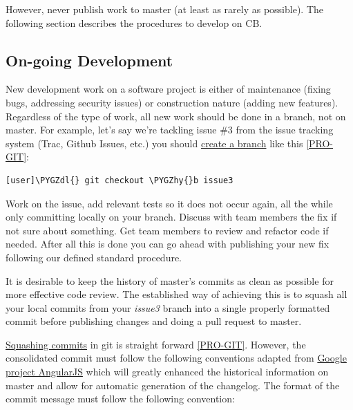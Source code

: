 \documentclass[letterpaper,10pt,english]{sphinxmanual}
\def\PYGZdl{\char`\$}
\def\PYGZhy{\char`\-}
\begin{document}
However, never publish work to master (at least as rarely as
possible). The following section describes the procedures to develop
on CB.


\subsection{On-going Development}
\label{developer-guide:on-going-development}
New development work on a software project is either of maintenance
(fixing bugs, addressing security issues) or construction nature
(adding new features). Regardless of the type of work, all new work
should be done in a branch, not on master. For example, let's say
we're tackling issue \#3 from the issue tracking system (Trac, Github
Issues, etc.) you should \href{http://www.git-scm.com/book/en/Git-Branching-Basic-Branching-and-Merging}{create a branch}
like this {\hyperref[developer-guide:pro-git]{{[}PRO-GIT{]}}}:

\begin{Verbatim}[commandchars=\\\{\}]
[user]\PYGZdl{} git checkout \PYGZhy{}b issue3
\end{Verbatim}

Work on the issue, add relevant tests so it does not occur again, all
the while only committing locally on your branch. Discuss with team
members the fix if not sure about something. Get team members to
review and refactor code if needed. After all this is done you can go
ahead with publishing your new fix following our defined standard
procedure.

It is desirable to keep the history of master's commits as clean as
possible for more effective code review. The established way of
achieving this is to squash all your local commits from your \emph{issue3}
branch into a single properly formatted commit before publishing
changes and doing a pull request to master.

\href{http://www.git-scm.com/book/en/Git-Tools-Rewriting-History\#Squashing-Commits}{Squashing commits}
in git is straight forward {\hyperref[developer-guide:pro-git]{{[}PRO-GIT{]}}}. However, the consolidated
commit must follow the following conventions adapted from \href{https://docs.google.com/document/d/1QrDFcIiPjSLDn3EL15IJygNPiHORgU1\_OOAqWjiDU5Y/edit\#}{Google
project AngularJS}
which will greatly enhanced the historical information on master and
allow for automatic generation of the changelog. The format of the
commit message must follow the following convention:
\end{document}
